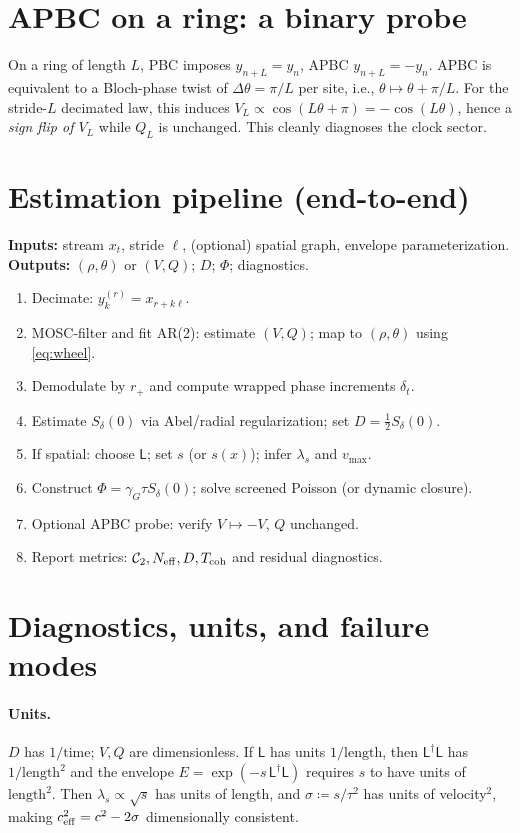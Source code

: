 \documentclass[12pt]{article}
\theoremstyle{definition}
\newcommand{\defeq}{\coloneqq}
\begin{document}
\section{APBC on a ring: a binary probe}
On a ring of length $L$, PBC imposes $y_{n+L}=y_n$, APBC $y_{n+L}=-y_n$.
APBC is equivalent to a Bloch-phase twist of $\Delta\theta=\pi/L$ per site, i.e., $\theta\mapsto\theta+\pi/L$.
For the stride-$L$ decimated law, this induces
$V_L\propto\cos(L\theta+\pi)=-\cos(L\theta)$, hence a \emph{sign flip of $V_L$} while $Q_L$ is unchanged.
This cleanly diagnoses the clock sector.

\section{Estimation pipeline (end-to-end)}\label{sec:pipeline}
\begin{algobox}
\textbf{Inputs:} stream $x_t$, stride $\ell$, (optional) spatial graph, envelope parameterization.\\
\textbf{Outputs:} $(\rho,\theta)$ or $(V,Q)$; $D$; $\Phi$; diagnostics.

\begin{enumerate}[leftmargin=2em,label=\arabic*.]
\item Decimate: $y^{(r)}_k=x_{r+k\ell}$.
\item MOSC-filter and fit AR(2): estimate $(V,Q)$; map to $(\rho,\theta)$ using \eqref{eq:wheel}.
\item Demodulate by $r_+$ and compute wrapped phase increments $\delta_t$.
\item Estimate $S_\delta(0)$ via Abel/radial regularization; set $D=\tfrac12 S_\delta(0)$.
\item If spatial: choose $\mathsf L$; set $s$ (or $s(x)$); infer $\lambda_s$ and $v_{\max}$.
\item Construct $\Phi=\gamma_G\tau S_\delta(0)$; solve screened Poisson (or dynamic closure).
\item Optional APBC probe: verify $V\mapsto -V$, $Q$ unchanged.
\item Report metrics: $\mathcal C_2, N_{\rm eff}, D, T_{\rm coh}$ and residual diagnostics.
\end{enumerate}
\end{algobox}

\section{Diagnostics, units, and failure modes}
\paragraph{Units.} $D$ has $1/\text{time}$; $V,Q$ are dimensionless.
If $\mathsf L$ has units $1/\text{length}$, then $\mathsf L^\dagger\mathsf L$ has $1/\text{length}^2$ and the envelope
$E=\exp(-s\,\mathsf L^\dagger\mathsf L)$ requires $s$ to have units of $\text{length}^2$.
Then $\lambda_s\propto\sqrt{s}$ has units of length, and $\sigma\defeq s/\tau^2$ has units of velocity$^2$,
making $c_{\rm eff}^2=c^2-2\sigma$ dimensionally consistent.
\end{document}
